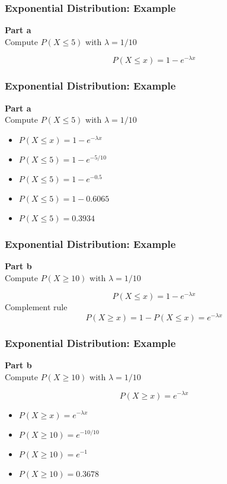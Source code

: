 \documentclass[IntroMain.tex]{subfiles}
\begin{document}
\begin{frame}[fragile]
\frametitle{Exponential Distribution: Example}
\vspace{-2.5cm}
\Large
\textbf{Part a}\\
Compute $P(X \leq 5)$ with $\lambda = 1/10$

\[ P(X \leq x) = 1-e^{-\lambda x} \]
\end{frame}

\begin{frame}[fragile]
\frametitle{Exponential Distribution: Example}
\Large
\vspace{-1cm}
\textbf{Part a}\\
Compute $P(X \leq 5)$ with $\lambda = 1/10$

\begin{itemize}
\item $ P(X \leq x) = 1-e^{-\lambda x} $
\item $ P(X \leq 5) = 1-e^{-5/10}  $
\item $ P(X \leq 5) = 1-e^{-0.5} $
\item $ P(X \leq 5) = 1-0.6065 $
\item $ P(X \leq 5) = 0.3934 $
\end{itemize} 

\end{frame}




\begin{frame}[fragile]
\frametitle{Exponential Distribution: Example}
\vspace{-2.5cm}
\Large
\textbf{Part b}\\
Compute $P(X \geq 10)$ with $\lambda = 1/10$

\[ P(X \leq x) = 1-e^{-\lambda x} \]
Complement rule
\[ P(X \geq x) = 1- P(X \leq x) =  e^{-\lambda x} \]


\end{frame}

\begin{frame}[fragile]
\frametitle{Exponential Distribution: Example}
\vspace{-1.5cm}
\Large
\textbf{Part b}\\
Compute $P(X \geq 10)$ with $\lambda = 1/10$

\[ P(X \geq x) = e^{-\lambda x} \]

\begin{itemize}
\item $ P(X \geq x) = e^{-\lambda x} $
\item $ P(X \geq 10) = e^{-10/10}  $
\item $ P(X \geq 10) = e^{-1} $
\item $ P(X \geq 10) =  0.3678 $
\end{itemize} 
\end{frame}
\end{document}
